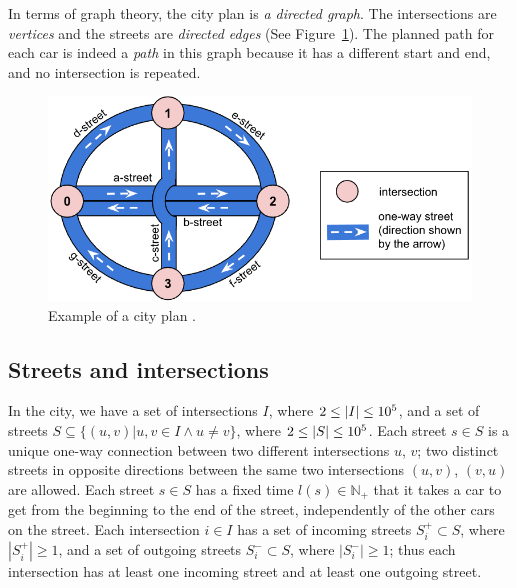 In terms of graph theory, the city plan is \textit{a directed graph}. The intersections are \textit{vertices} and the streets are \textit{directed edges} (See Figure~\ref{fig:hashcode_city_plan}). The planned path for each car is indeed a \textit{path} in this graph because it has a different start and end, and no intersection is repeated.

\begin{figure}
    \centering
    \includegraphics[width=\linewidth]{img/hashcode/figure1.png}
    \caption[Example of a city plan]{
        Example of a city plan \cite{google_coding_competitions}.
    }
    \label{fig:hashcode_city_plan}
\end{figure}

\subsection{Streets and intersections}

In the city, we have a set of intersections
$I$, where $2 \leq \left|{I}\right| \leq 10^5$,
and a set of streets
$S \subseteq \{(u, v) | u,v \in I \land u \neq v\}$, where $2 \leq \left|{S}\right| \leq 10^5$.
Each street $s \in S$ is a unique one-way connection between two different intersections $u$, $v$; two distinct streets in opposite directions between the same two intersections $(u, v)$, $(v, u)$ are allowed. Each street $s \in S$ has a fixed time $l(s) \in \mathbb{N}_+$ that it takes a car to get from the beginning to the end of the street, independently of the other cars on the street.
Each intersection $i \in I$ has a set of incoming streets $S_i^+ \subset S$, where $|S_i^+| \geq 1$, and a set of outgoing streets $S_i^- \subset S$, where $|S_i^-| \geq 1$; thus each intersection has at least one incoming street and at least one outgoing street.

